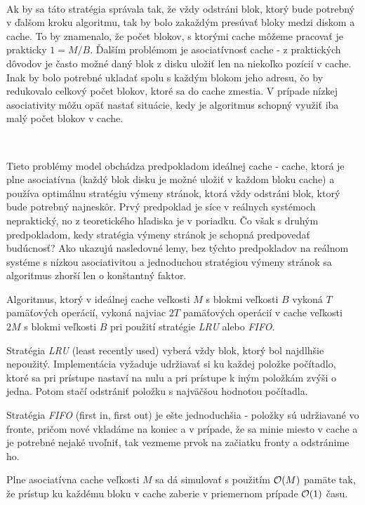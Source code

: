 \

Ak by sa táto stratégia správala tak, že vždy odstráni blok, ktorý bude potrebný v ďalšom kroku algoritmu, tak by bolo zakaždým presúvať bloky medzi diskom a cache. To by znamenalo, že počet blokov, s ktorými cache môžeme pracovať je prakticky $1 = M/B$. Ďalším problémom je asociatívnosť cache - z praktických dôvodov je často možné daný blok z disku uložiť len na niekoľko pozícií v cache. Inak by bolo potrebné ukladať spolu s každým blokom jeho adresu, čo by redukovalo celkový počet blokov, ktoré sa do cache zmestia. V prípade nízkej asociativity môžu opäť nastať situácie, kedy je algoritmus schopný využiť iba malý počet blokov v cache.

\

Tieto problémy \obliv model obchádza predpokladom ideálnej cache - cache, ktorá je plne asociatívna (každý blok disku je možné uložiť v každom bloku cache) a používa optimálnu stratégiu výmeny stránok, ktorá vždy odstráni blok, ktorý bude potrebný najneskôr. Prvý predpoklad je síce v reálnych systémoch nepraktický, no z teoretického hľadiska je v poriadku. Čo však s druhým predpokladom, kedy stratégia výmeny stránok je schopná predpovedať budúcnosť? Ako ukazujú nasledovné lemy, bez týchto predpokladov na reálnom systéme s nízkou asociativitou a jednoduchou stratégiou výmeny stránok sa algoritmus zhorší len o konštantný faktor.

\begin{lema}
Algoritmus, ktorý v ideálnej cache veľkosti $M$ s blokmi veľkosti $B$ vykoná $T$ pamäťových operácií, vykoná najviac $2T$ pamäťových operácií v cache veľkosti $2M$ s blokmi veľkosti $B$ pri použití stratégie {\em LRU} alebo {\em FIFO}. \citep[Lemma 12]{FrigoLePr99}
\end{lema}

Stratégia {\em LRU} (least recently used) vyberá vždy blok, ktorý bol najdlhšie nepoužitý. Implementácia vyžaduje udržiavať si ku každej položke počítadlo, ktoré sa pri prístupe nastaví na nulu a pri prístupe k iným položkám zvýši o jedna. Potom stačí odstrániť položku s najväčšou hodnotou počítadla.

Stratégia {\em FIFO} (first in, first out) je ešte jednoduchšia - položky sú udržiavané vo fronte, pričom nové vkladáme na koniec a v prípade, že sa minie miesto v cache a je potrebné nejaké uvoľniť, tak vezmeme prvok na začiatku fronty a odstránime ho.

\begin{lema}
Plne asociatívna cache veľkosti $M$ sa dá simulovať s použitím $\mathcal{O}(M)$ pamäte tak, že prístup ku každému bloku v cache zaberie v priemernom prípade $\mathcal{O}(1)$ času. \citep[Lemma 16]{FrigoLePr99}
\end{lema}

